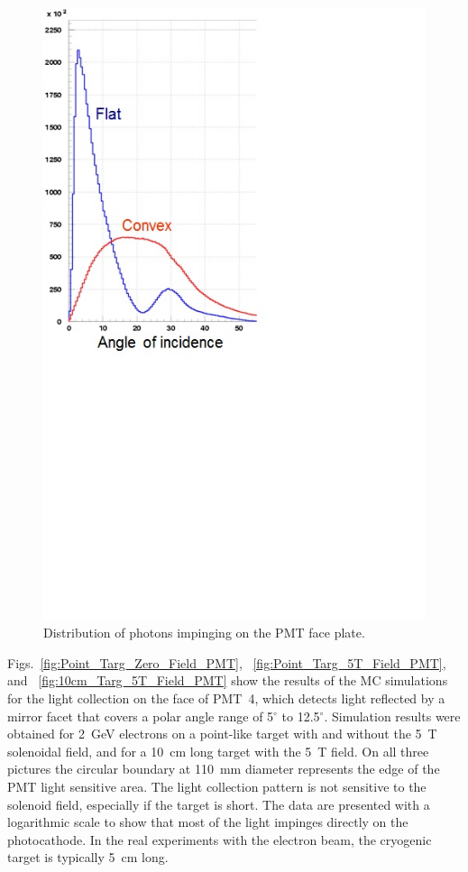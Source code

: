 \begin{figure}[!ht]
    \centering
    \includegraphics[width=1.0\linewidth,trim={0.0cm 9.1cm 6.3cm 0.1cm},clip]{images/Flat_Convex.jpg}
    \caption{Distribution of photons impinging on the PMT face plate.}
    \label{fig:Flat_Convex}
\end{figure}

Figs.~\ref{fig:Point_Targ_Zero_Field_PMT}, ~\ref{fig:Point_Targ_5T_Field_PMT}, and
~\ref{fig:10cm_Targ_5T_Field_PMT} show the results of the MC simulations for the light collection on the face
of PMT~4, which detects light reflected by a mirror facet that covers a polar angle range of 5$^\circ$ to 12.5$^\circ$.
Simulation results were obtained for 2~GeV electrons on a point-like target with and without the 5~T solenoidal
field, and for a 10~cm long target with the 5~T field. On all three pictures the circular boundary at 110~mm diameter
represents the edge of the PMT light sensitive area. The light collection pattern is not sensitive to the solenoid field,
especially if the target is short. The data are presented with a logarithmic scale to show that most of the light
impinges directly on the photocathode. In the real experiments with the electron beam, the cryogenic target is
typically 5~cm long. 

